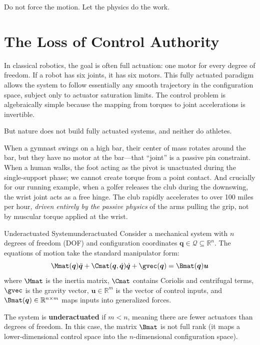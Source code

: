 \documentclass[12pt, openany]{book}
\theoremstyle{plain}
\newcommand{\control}{\bm{u}}
\newcommand{\configspace}{\mathcal{Q}}
\newcommand{\Reals}{\mathbb{R}}
\begin{document}
\epigraph{%
  Do not force the motion. Let the physics do the work.
}{}

\vspace{0.5cm}

\section{The Loss of Control Authority}

In classical robotics, the goal is often full actuation: one motor for every degree of freedom. If a robot has six joints, it has six motors. This fully actuated paradigm allows the system to follow essentially any smooth trajectory in the configuration space, subject only to actuator saturation limits. The control problem is algebraically simple because the mapping from torques to joint accelerations is invertible.

But nature does not build fully actuated systems, and neither do athletes.

When a gymnast swings on a high bar, their center of mass rotates around the bar, but they have no motor at the bar---that ``joint'' is a passive pin constraint. When a human walks, the foot acting as the pivot is unactuated during the single-support phase; we cannot create torque from a point contact. And crucially for our running example, when a golfer releases the club during the downswing, the wrist joint acts as a free hinge. The club rapidly accelerates to over 100 miles per hour, \emph{driven entirely by the passive physics} of the arms pulling the grip, not by muscular torque applied at the wrist.

\begin{definition}{Underactuated System}{underactuated}
  Consider a mechanical system with $n$ degrees of freedom (DOF) and configuration coordinates $\bm{q} \in \configspace \subseteq \Reals^n$. The equations of motion take the standard manipulator form:
  \begin{equation}
    \Mmat(\bm{q})\ddot{\bm{q}} + \Cmat(\bm{q}, \dot{\bm{q}})\dot{\bm{q}} + \gvec(\bm{q}) = \Bmat(\bm{q}) \control
  \end{equation}
  where $\Mmat$ is the inertia matrix, $\Cmat$ contains Coriolis and centrifugal terms, $\gvec$ is the gravity vector, $\control \in \Reals^m$ is the vector of control inputs, and $\Bmat(\bm{q}) \in \Reals^{n \times m}$ maps inputs into generalized forces.
  
  The system is \textbf{underactuated} if $m < n$, meaning there are fewer actuators than degrees of freedom. In this case, the matrix $\Bmat$ is not full rank (it maps a lower-dimensional control space into the $n$-dimensional configuration space).
\end{definition}
\end{document}
